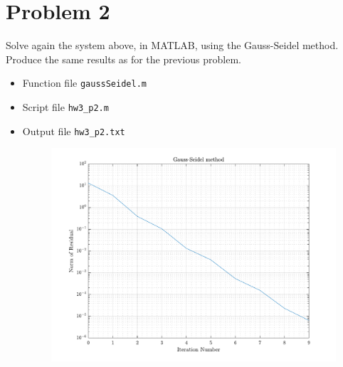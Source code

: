 \section{Problem 2}%
\label{sec:problem_2}
Solve again the system above, in MATLAB, using the Gauss-Seidel method. Produce the same results as for the previous problem.
\begin{solution}
  \quad
  \begin{itemize}
    \item
      Function file \verb|gaussSeidel.m|
      
    \item
      Script file \verb|hw3_p2.m|
      
    \item
      Output file \verb|hw3_p2.txt|
      
      \begin{figure}[!hbtp]
        \centering
        \includegraphics[width=0.8\linewidth]{../src/hw3_p2.pdf}
        \caption{}%
        \label{fig:}
      \end{figure}
  \end{itemize}
\end{solution}


